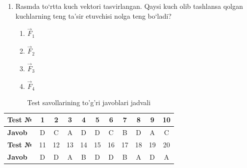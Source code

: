 \begin{enumerate}
\item Rasmda to‘rtta kuch vektori tasvirlangan. Qaysi kuch olib tashlansa qolgan kuchlarning teng ta’sir etuvchisi nolga teng bo‘ladi?



\begin{enumerate}[label=\Alph*)]
\item $\vec{F}_1$
\item $\vec{F}_2$
\item $\vec{F}_3$
\item $\vec{F}_4$
\end{enumerate}

\end{enumerate}


\begin{table}[h!]
\centering
\caption{Test savollarining to'g'ri javoblari jadvali}
\begin{tabular}{|l|c|c|c|c|c|c|c|c|c|c|}
\hline
\textbf{Test №} & 1 & 2 & 3 & 4 & 5 & 6 & 7 & 8 & 9 & 10 \\ \hline
\textbf{Javob}  & D & C & A & D & D & C & B & D & A & C \\ \hline
\hline
\textbf{Test №} & 11 & 12 & 13 & 14 & 15 & 16 & 17 & 18 & 19 & 20 \\ \hline
\textbf{Javob}  & D & D & A & B & D & D & B & A & D & A \\ \hline
\end{tabular}
\end{table}













